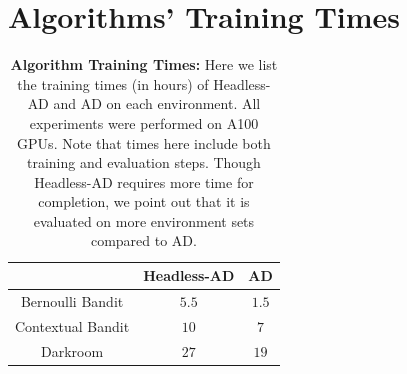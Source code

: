 \section{Algorithms' Training Times}

\begin{table}[h]
    \caption{\textbf{Algorithm Training Times:} Here we list the training times (in hours) of Headless-AD and AD on each environment. All experiments were performed on A100 GPUs. Note that times here include both training and evaluation steps. Though Headless-AD requires more time for completion, we point out that it is evaluated on more environment sets compared to AD.}
    \label{tab:algo_training_times}
    \centering
    \begin{tabular}{c|c|c}
         & Headless-AD & AD \\
        \hline 
        Bernoulli Bandit & $5.5$ & $1.5$ \\
        Contextual Bandit & $10$ & $7$ \\
        Darkroom & $27$ & $19$ \\
    \end{tabular}
\end{table}